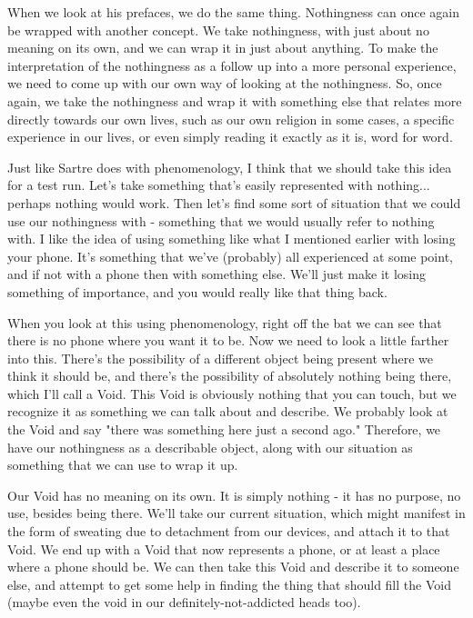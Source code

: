 \documentclass[12pt]{article}
\begin{document}
  When we look at his prefaces, we do the same thing. Nothingness can once again be wrapped with another concept.
  We take nothingness, with just about no meaning on its own, and we can wrap it in just about anything. To make the
  interpretation of the nothingness as a follow up into a more personal experience, we need to come up with our own
  way of looking at the nothingness. So, once again, we take the nothingness and wrap it with something else that
  relates more directly towards our own lives, such as our own religion in some cases, a specific experience in our
  lives, or even simply reading it exactly as it is, word for word.

  Just like Sartre does with phenomenology, I think that we should take this idea for a test run. Let's take something
  that's easily represented with nothing... perhaps nothing would work. Then let's find some sort of situation that
  we could use our nothingness with - something that we would usually refer to nothing with. I like the idea of using
  something like what I mentioned earlier with losing your phone. It's something that we've (probably) all experienced
  at some point, and if not with a phone then with something else. We'll just make it losing something of importance,
  and you would really like that thing back.

  When you look at this using phenomenology, right off the bat we can see that there is no phone where you want it to
  be. Now we need to look a little farther into this. There's the possibility of a different object being present
  where we think it should be, and there's the possibility of absolutely nothing being there, which I'll call a Void.
  This Void is obviously nothing that you can touch, but we recognize it as something we can talk about and describe.
  We probably look at the Void and say "there was something here just a second ago." Therefore, we have our nothingness
  as a describable object, along with our situation as something that we can use to wrap it up.

  Our Void has no meaning on its own. It is simply nothing - it has no purpose, no use, besides being there. We'll take
  our current situation, which might manifest in the form of sweating due to detachment from our devices, and attach it
  to that Void. We end up with a Void that now represents a phone, or at least a place where a phone should be. We can
  then take this Void and describe it to someone else, and attempt to get some help in finding the thing that should
  fill the Void (maybe even the void in our definitely-not-addicted heads too).
\end{document}
